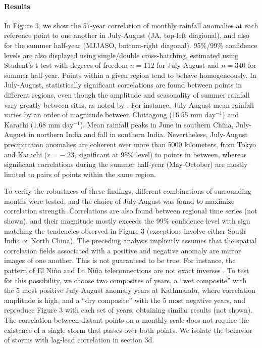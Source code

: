 \documentclass[12pt]{article}
\begin{document}
\paragraph{Results}
	In Figure 3, we show the 57-year correlation of monthly rainfall anomalies at each reference point to one another in July-August (JA, top-left diagional), and also for the summer half-year (MJJASO, bottom-right diagonal). 95\%/99\% confidence levels are also displayed using single/double cross-hatching, estimated using Student's t-test with degrees of freedom $n=112$ for July-August and $n=340$ for summer half-year. Points within a given region tend to behave homogeneously. In July-August, statistically significant correlations are found between points in different regions, even though the amplitude and seasonality of summer rainfall vary greatly between sites, as noted by \cite{Wang2002}. For instance, July-August mean rainfall varies by an order of magnitude between Chittagong (16.55 mm day$^{-1}$) and Karachi (1.68 mm day$^{-1}$). Mean rainfall peaks in June in southern China, July-August in northern India and fall in southern India. Nevertheless, July-August precipitation anomalies are coherent over more than 5000 kilometers, from Tokyo and Karachi ($r=-.23$, significant at 95\% level) to points in between, whereas significant correlations during the summer half-year (May-October) are mostly limited to pairs of points within the same region.
	
	  To verify the robustness of these findings, different combinations of surrounding months were tested, and the choice of July-August was found to maximize correlation strength. Correlations are also found between regional time series (not shown), and their magnitude mostly exceeds the 99\% confidence level with sign matching the tendencies observed in Figure 3 (exceptions involve either South India or North China). The preceding analysis implicitly assumes that the spatial correlation fields associated with a positive and negative anomaly are mirror images of one another. This is not guaranteed to be true. For instance, the pattern of El Ni\~no and La Ni\~na teleconnections are not exact inverses \citep{Hoerling1997}. To test for this possibility, we choose two composites of years, a ``wet composite'' with the 5 most positive July-August anomaly years at Kathmandu, where correlation amplitude is high, and a ``dry composite'' with the 5 most negative years, and reproduce Figure 3 with each set of years, obtaining similar results (not shown). The correlation between distant points on a monthly scale does not require the existence of a single storm that passes over both points. We isolate the behavior of storms with lag-lead correlation in section 3d.
			
\end{document}
